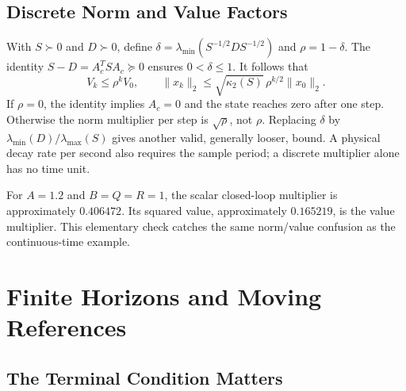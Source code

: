 \subsection{Discrete Norm and Value Factors}

With $S\succ0$ and $D\succ0$, define $\delta=\lambda_{\min}(S^{-1/2}DS^{-1/2})$ and $\rho=1-\delta$. The identity $S-D=A_c^TSA_c\succeq0$ ensures $0<\delta\le1$. It follows that
\begin{equation}
V_k\le\rho^k V_0,\qquad
\|x_k\|_2\le\sqrt{\kappa_2(S)}\,\rho^{k/2}\|x_0\|_2.
\end{equation}
If $\rho=0$, the identity implies $A_c=0$ and the state reaches zero after one step. Otherwise the norm multiplier per step is $\sqrt\rho$, not $\rho$. Replacing $\delta$ by $\lambda_{\min}(D)/\lambda_{\max}(S)$ gives another valid, generally looser, bound. A physical decay rate per second also requires the sample period; a discrete multiplier alone has no time unit.

For $A=1.2$ and $B=Q=R=1$, the scalar closed-loop multiplier is approximately $0.406472$. Its squared value, approximately $0.165219$, is the value multiplier. This elementary check catches the same norm/value confusion as the continuous-time example.

\section{Finite Horizons and Moving References}

\subsection{The Terminal Condition Matters}

